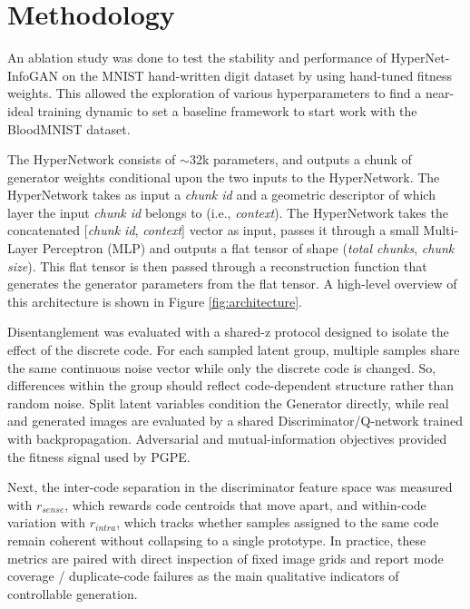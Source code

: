 \documentclass[letterpaper]{article} %
\begin{document}
	\section{Methodology}
	An ablation study was done to test the stability and performance of HyperNet-InfoGAN on the MNIST hand-written digit dataset by using hand-tuned fitness weights. This allowed the exploration of various hyperparameters to find a near-ideal training dynamic to set a baseline framework to start work with the BloodMNIST dataset.
	
	The HyperNetwork consists of $\sim$32k parameters, and outputs a chunk of generator weights conditional upon the two inputs to the HyperNetwork. The HyperNetwork takes as input a \textit{chunk id} and a geometric descriptor of which layer the input \textit{chunk id} belongs to (i.e., \textit{context}). The HyperNetwork takes the concatenated [\textit{chunk id}, \textit{context}] vector as input, passes it through a small Multi-Layer Perceptron (MLP) and outputs a flat tensor of shape (\textit{total chunks}, \textit{chunk size}). This flat tensor is then passed through a reconstruction function that generates the generator parameters from the flat tensor. A high-level overview of this architecture is shown in Figure \ref{fig:architecture}.
	
	Disentanglement was evaluated with a shared-z protocol designed to isolate the effect of the discrete code. For each sampled latent group, multiple samples share the same continuous noise vector while only the discrete code is changed. So, differences within the group should reflect code-dependent structure rather than random noise. Split latent variables condition the Generator directly, while real and generated images are evaluated by a shared Discriminator/Q-network trained with backpropagation. Adversarial and mutual-information objectives provided the fitness signal used by PGPE.
	
	Next, the inter-code separation in the discriminator feature space was measured with $r_{sense}$, which rewards code centroids that move apart, and within-code variation with $r_{intra}$, which tracks whether samples assigned to the same code remain coherent without collapsing to a single prototype. In practice, these metrics are paired with direct inspection of fixed image grids and report mode coverage / duplicate-code failures as the main qualitative indicators of controllable generation.
	
\end{document}
